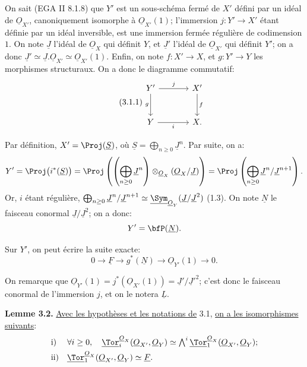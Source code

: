 
On sait (EGA II 8.1.8) que \(Y'\) est un sous-schéma fermé de \(X'\) défini par un idéal de \(\underline{O}_{X'}\), canoniquement isomorphe à \(\underline{O}_{X'}(1)\); l'immersion \(j:Y'\to X'\) étant définie par un idéal inversible, est une immersion fermée régulière de codimension \(1\). On note \(\underline{J}\) l'idéal de \(\underline{O}_X\) qui définit \(Y\), et \(\underline{J}'\) l'idéal de \(\underline{O}_{X'}\) qui définit \(Y'\); on a donc \(\underline{J}'\simeq \underline{J}.\underline{O}_{X'}\simeq\underline{O}_{X'}(1)\). Enfin, on note \(f:X'\to X\), et \(g:Y'\to Y\) les morphismes structuraux. On a donc le diagramme commutatif:
\begin{equation}\tag{3.1.1}
\begin{tikzcd}[column sep=large,row sep=large]
Y' \arrow[r,"j"] \arrow[d,"g"'] & X' \arrow[d,"f"]\\
Y \arrow[r,"i"'] & X.
\end{tikzcd}
\end{equation}

Par définition, \(X'=\Proj(\underline{S})\), où \(\underline{S}=\bigoplus_{n\ge0}\underline{J}^n\). Par suite, on a:
\[
Y'=\Proj\bigl(i^*(\underline{S})\bigr)
=\Proj\left(\left(\bigoplus_{n\ge0}\underline{J}^n\right)\otimes_{\underline{O}_X}(\underline{O}_X/\underline{J})\right)
=\Proj\left(\bigoplus_{n\ge0}\underline{J}^n/\underline{J}^{n+1}\right).
\]
Or, \(i\) étant régulière, \(\bigoplus_{n\ge0}\underline{J}^n/\underline{J}^{n+1}\simeq \underline{\Sym}_{\underline{O}_Y}(\underline{J}/\underline{J}^2)\) (1.3). On note \(\underline{N}\) le faisceau conormal \(\underline{J}/\underline{J}^2\); on a donc:
\[
Y'=\bfP(\underline{N}).
\]

Sur \(Y'\), on peut écrire la suite exacte:
\begin{equation}\tag{3.1.2}
0\to \underline{F}\to g^*(\underline{N})\to\underline{O}_{Y'}(1)\to0.
\end{equation}

On remarque que \(\underline{O}_{Y'}(1)=j^*(\underline{O}_{X'}(1))=\underline{J}'/\underline{J}'^2\); c'est donc le faisceau conormal de l'immersion \(j\), et on le notera \(\underline{L}\).

\textbf{Lemme 3.2.} \uline{Avec les hypothèses et les notations de} 3.1, \uline{on a les isomorphismes suivants}:
\[
\begin{array}{ll}
\text{i)}&
\forall i\ge0,\quad
\underline{\Tor}_i^{\underline{O}_X}(\underline{O}_{X'},\underline{O}_Y)
\simeq
\bigwedge^i\underline{\Tor}_1^{\underline{O}_X}(\underline{O}_{X'},\underline{O}_Y);\\[4pt]
\text{ii)}&
\underline{\Tor}_1^{\underline{O}_X}(\underline{O}_{X'},\underline{O}_Y)\simeq \underline{F}.
\end{array}
\]


